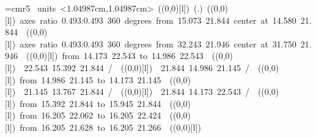 %
%
\font\thinlinefont=cmr5
%
\begingroup\makeatletter\ifx\SetFigFont\undefined%
\gdef\SetFigFont#1#2#3#4#5{%
  \reset@font\fontsize{#1}{#2pt}%
  \fontfamily{#3}\fontseries{#4}\fontshape{#5}%
  \selectfont}%
\fi\endgroup%
\mbox{\beginpicture
\setcoordinatesystem units <1.04987cm,1.04987cm>
\unitlength=1.04987cm
\linethickness=1pt
\setplotsymbol ({\makebox(0,0)[l]{\tencirc{}}})
\setshadesymbol ({\thinlinefont .})
\setlinear
%
%
\linethickness=1pt
\setplotsymbol ({\makebox(0,0)[l]{\tencirc{}}})
{\color[rgb]{0,0,0}\ellipticalarc axes ratio  0.493:0.493  360 degrees 
	from 15.073 21.844 center at 14.580 21.844
}%
%
%
\linethickness=1pt
\setplotsymbol ({\makebox(0,0)[l]{\tencirc{}}})
{\color[rgb]{0,0,0}\ellipticalarc axes ratio  0.493:0.493  360 degrees 
	from 32.243 21.946 center at 31.750 21.946
}%
%
%
\linethickness=1pt
\setplotsymbol ({\makebox(0,0)[l]{\tencirc{}}})
{\color[rgb]{0,0,0}\putrule from 14.173 22.543 to 14.986 22.543
}%
%
%
\linethickness=1pt
\setplotsymbol ({\makebox(0,0)[l]{\tencirc{}}})
{\color[rgb]{0,0,0} 22.543 15.392 21.844 /
}%
%
%
\linethickness=1pt
\setplotsymbol ({\makebox(0,0)[l]{\tencirc{}}})
{\color[rgb]{0,0,0} 21.844 14.986 21.145 /
}%
%
%
\linethickness=1pt
\setplotsymbol ({\makebox(0,0)[l]{\tencirc{}}})
{\color[rgb]{0,0,0}\putrule from 14.986 21.145 to 14.173 21.145
}%
%
%
\linethickness=1pt
\setplotsymbol ({\makebox(0,0)[l]{\tencirc{}}})
{\color[rgb]{0,0,0} 21.145 13.767 21.844 /
}%
%
%
\linethickness=1pt
\setplotsymbol ({\makebox(0,0)[l]{\tencirc{}}})
{\color[rgb]{0,0,0} 21.844 14.173 22.543 /
}%
%
%
\linethickness=1pt
\setplotsymbol ({\makebox(0,0)[l]{\tencirc{}}})
{\color[rgb]{0,0,0}\putrule from 15.392 21.844 to 15.945 21.844
}%
%
%
\linethickness=1pt
\setplotsymbol ({\makebox(0,0)[l]{\tencirc{}}})
{\color[rgb]{0,0,0}\putrule from 16.205 22.062 to 16.205 22.424
}%
%
%
\linethickness=1pt
\setplotsymbol ({\makebox(0,0)[l]{\tencirc{}}})
{\color[rgb]{0,0,0}\putrule from 16.205 21.628 to 16.205 21.266
}%
%
%
\linethickness=1pt
\setplotsymbol ({\makebox(0,0)[l]{\tencirc{}}})
}
